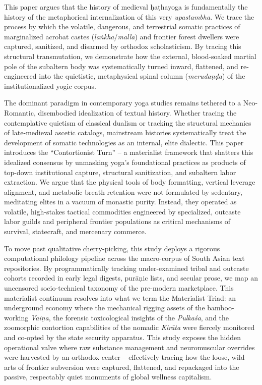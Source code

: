 \documentclass[11pt,twoside,letterpaper]{article}
\begin{document}
This paper argues that the history of medieval \d{h}a\d{t}hayoga is fundamentally the history of the metaphorical internalization of this very \textit{upastambha}. We trace the process by which the volatile, dangerous, and terrestrial somatic practices of marginalized acrobat castes (\textit{la\.{n}kha}/\textit{malla}) and frontier forest dwellers were captured, sanitized, and disarmed by orthodox scholasticism. By tracing this structural transmutation, we demonstrate how the external, blood-soaked martial pole of the subaltern body was systematically turned inward, flattened, and re-engineered into the quietistic, metaphysical spinal column (\textit{meruda\d{n}\d{d}a}) of the institutionalized yogic corpus.

The dominant paradigm in contemporary yoga studies remains tethered to a Neo-Romantic, disembodied idealization of textual history. Whether tracing the contemplative quietism of classical dualism or tracking the structural mechanics of late-medieval ascetic catalogs, mainstream histories systematically treat the development of somatic technologies as an internal, elite dialectic. This paper introduces the ``Contortionist Turn'' -- a materialist framework that shatters this idealized consensus by unmasking yoga's foundational practices as products of top-down institutional capture, structural sanitization, and subaltern labor extraction. We argue that the physical tools of body formatting, vertical leverage alignment, and metabolic breath-retention were not formulated by sedentary, meditating elites in a vacuum of monastic purity. Instead, they operated as volatile, high-stakes tactical commodities engineered by specialized, outcaste labor guilds and peripheral frontier populations as critical mechanisms of survival, statecraft, and mercenary commerce.

To move past qualitative cherry-picking, this study deploys a rigorous computational philology pipeline across the macro-corpus of South Asian text repositories. By programmatically tracking under-examined tribal and outcaste cohorts recorded in early legal digests, pur\={a}\d{n}ic lists, and secular prose, we map an uncensored socio-technical taxonomy of the pre-modern marketplace. This materialist continuum resolves into what we term the Materialist Triad: an underground economy where the mechanical rigging assets of the bamboo-working \textit{Vai\d{n}a}, the forensic toxicological insights of the \textit{Pulka\'sa}, and the zoomorphic contortion capabilities of the nomadic \textit{Kir\={a}ta} were fiercely monitored and co-opted by the state security apparatus. This study exposes the hidden operational valve where raw substance management and neuromuscular overrides were harvested by an orthodox center -- effectively tracing how the loose, wild arts of frontier subversion were captured, flattened, and repackaged into the passive, respectably quiet monuments of global wellness capitalism.
\end{document}
